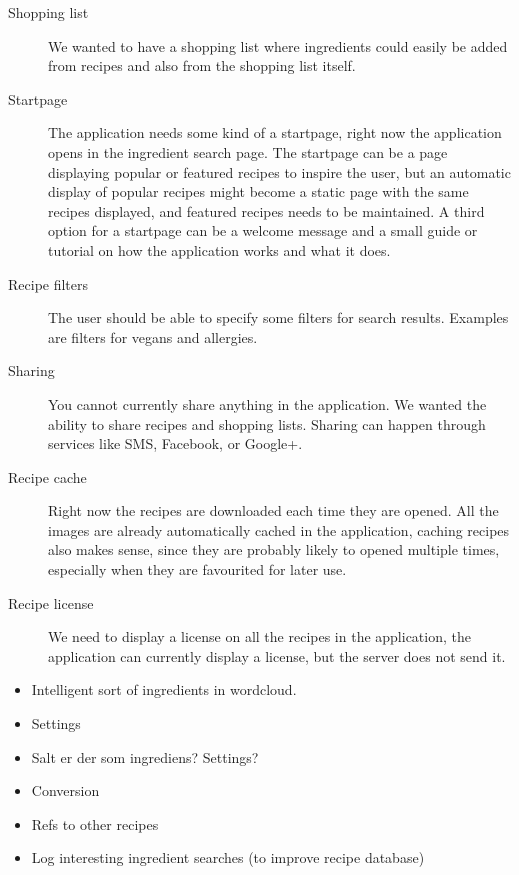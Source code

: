 \begin{description}
\item[Shopping list] We wanted to have a shopping list where ingredients could easily be added from recipes and also from the shopping list itself.
\item[Startpage] The application needs some kind of a startpage, right now the application opens in the ingredient search page. The startpage can be a page displaying popular or featured recipes to inspire the user, but an automatic display of popular recipes might become a static page with the same recipes displayed, and featured recipes needs to be maintained. A third option for a startpage can be a welcome message and a small guide or tutorial on how the application works and what it does.
\item[Recipe filters] The user should be able to specify some filters for search results. Examples are filters for vegans and allergies.
\item[Sharing] You cannot currently share anything in the application. We wanted the ability to share recipes and shopping lists. Sharing can happen through services like SMS, Facebook, or Google+.
\item[Recipe cache] Right now the recipes are downloaded each time they are opened. All the images are already automatically cached in the application, caching recipes also makes sense, since they are probably likely to opened multiple times, especially when they are favourited for later use.
\item[Recipe license] We need to display a license on all the recipes in the application, the application can currently display a license, but the server does not send it.
\end{description}

\begin{itemize}
\item Intelligent sort of ingredients in wordcloud.
\item Settings
\item Salt er der som ingrediens? Settings?
\item Conversion
\item Refs to other recipes
\item Log interesting ingredient searches (to improve recipe database)
\end{itemize}